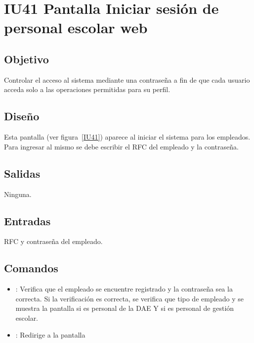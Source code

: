 \section{IU41 Pantalla Iniciar sesión de personal escolar web}

\subsection{Objetivo}
	Controlar el acceso al sistema mediante una contraseña a fin de que cada usuario acceda solo a las operaciones permitidas para su perfil.

\subsection{Diseño}
	Esta pantalla  (ver figura~\ref{IU41}) aparece al iniciar el sistema para los empleados. Para ingresar al mismo se debe escribir el RFC del empleado y la contraseña. 


\subsection{Salidas}

	Ninguna.

\subsection{Entradas}
	RFC y contraseña del empleado.

\subsection{Comandos}
\begin{itemize}
	\item {}: Verifica que el empleado se encuentre registrado y la contraseña sea la correcta. Si la verificación es correcta, se verifica que tipo de empleado y se muestra la pantalla  si es personal de la DAE Y  si es personal de gestión escolar.
	
	\item {}: Redirige a la pantalla 
	
\end{itemize}

